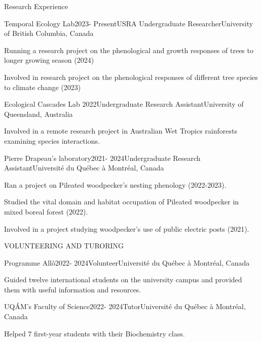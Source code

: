 \documentclass[
	11pt, %
]{resume} %
\begin{document}
\begin{rSection}{Research Experience}

	\begin{rSubsection}{Temporal Ecology Lab}{2023- Present}{USRA Undergraduate Researcher}{University of British Columbia, Canada}
		\item Running a research project on the phenological and growth responses of trees to longer growing season (2024) 
		\item Involved in research project on the phenological responses of different tree species to climate change (2023)
	\end{rSubsection}


	\begin{rSubsection}{Ecological Cascades Lab }{2022}{Undergraduate Research Assistant}{University of Queensland, Australia}
		\item Involved in a remote research project in Australian Wet Tropics rainforests examining species interactions.
	\end{rSubsection}


	\begin{rSubsection}{Pierre Drapeau’s laboratory}{2021- 2024}{Undergraduate Research Assistant}{Université du Québec à Montréal, Canada}
		\item Ran a project on Pileated woodpecker's nesting phenology (2022-2023).
		\item Studied the vital domain and habitat occupation of Pileated woodpecker in mixed boreal forest (2022).
		\item Involved in a project studying woodpecker's use of public electric posts (2021).
	\end{rSubsection}
\end{rSection}


\begin{rSection}{VOLUNTEERING AND TURORING}
	\begin{rSubsection}{Programme Allô}{2022- 2024}{Volunteer}{Université du Québec à Montréal, Canada}
		\item Guided twelve international students on the university campus and provided them with useful information and resources.
	\end{rSubsection}
	\begin{rSubsection}{UQÁM's Faculty of Science}{2022- 2024}{Tutor}{Université du Québec à Montréal, Canada}
		\item Helped 7 first-year students with their Biochemistry class.
	\end{rSubsection}
\end{rSection}
\end{document}
